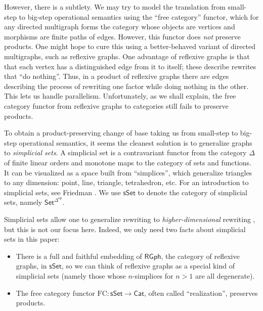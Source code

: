 \documentclass{amsart}
\theoremstyle{definition}
\newcommand{\sSet}{\mathsf{sSet}}
\newcommand{\RGph}{\mathsf{RGph}}
\newcommand{\Set}{\mathsf{Set}}
\newcommand{\Cat}{\mathsf{Cat}}
\newcommand{\FC}{\mathrm{FC}}
\newcommand{\op}{\mathrm{op}}
\newcommand{\maps}{\colon}
\begin{document}
However, there is a subtlety.  We may try to model the translation from small-step to big-step operational semantics using the ``free category'' functor, which for any directed multigraph forms the category whose objects are vertices and morphisms are finite paths of edges.   However, this functor does \emph{not} preserve products.   One might hope to cure this using a better-behaved variant of directed multigraphs, such as reflexive graphs.    One advantage of reflexive graphs is that that each vertex has a distinguished edge from it to itself; these describe rewrites that ``do nothing''.  Thus, in a product of reflexive graphs there are edges describing the process of rewriting one factor while doing nothing in the other.  This lets us handle parallelism.  Unfortunately, as we shall explain, the free category functor from reflexive graphs to categories still fails to preserve products.

To obtain a product-preserving change of base taking us from small-step to big-step operational semantics, it seems the cleanest solution is to generalize graphs to \emph{simplicial sets}.  A simplicial set is a contravariant functor from the category $\Delta$ of finite linear orders and monotone maps to the category of sets and functions.  It can be visualized as a space built from ``simplices'', which generalize triangles to any dimension: point, line, triangle, tetrahedron, etc. For an introduction to simplicial sets, see Friedman \cite{sset}.  We use $\sSet$ to denote the category of simplicial sets, namely $\Set^{\Delta^{\op}}$.

Simplicial sets allow one to generalize rewriting to \emph{higher-dimensional} rewriting \cite{hdra}, but this is not our focus here.  Indeed, we only need two facts about simplicial sets in this paper:

\begin{itemize}
\item There is a full and faithful embedding of $\RGph$, the category of reflexive graphs, in $\sSet$, so we can think of reflexive graphs as a special kind of simplicial sets (namely those whose $n$-simplices for $n > 1$ are all degenerate).
\item The free category functor $\FC \maps \sSet \to \Cat$, often called ``realization'', preserves products.
\end{itemize}
\end{document}
